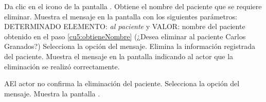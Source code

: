 \begin{UCtrayectoria}
	\UCpaso[\UCactor] Da clic en el icono \btnEliminar{} de la pantalla .
	\UCpaso[\UCsist] \label{cu5:obtieneNombre}Obtiene el nombre del paciente que se requiere eliminar.
	\UCpaso[\UCsist] Muestra el mensaje  en la pantalla  con los siguientes parámetros: DETERMINADO ELEMENTO: {\em al paciente} y VALOR: nombre del paciente obtenido en el paso \ref{cu5:obtieneNombre} (¿Desea eliminar al paciente Carlos Granados?)
	\UCpaso[\UCactor] Selecciona la opción  del mensaje. 
	\UCpaso[\UCsist] Elimina la información registrada del paciente.
	\UCpaso[\UCsist] Muestra el mensaje  en la pantalla  indicando al actor que la eliminación se realizó correctamente.
\end{UCtrayectoria}


\begin{UCtrayectoriaA}{A}{El actor no confirma la eliminación del paciente.}
	\UCpaso[\UCactor] Selecciona la opción  del mensaje.
	\UCpaso[\UCsist] Muestra la pantalla .
\end{UCtrayectoriaA}
